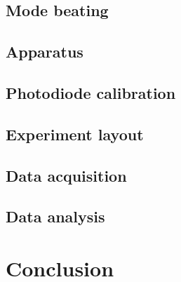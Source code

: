 \subsection{Mode beating}

\subsection{Apparatus}




\subsection{Photodiode calibration}

\subsection{Experiment layout}

\subsection{Data acquisition}

\subsection{Data analysis}

\section{Conclusion}

